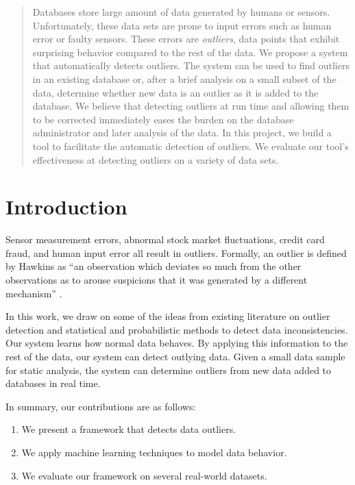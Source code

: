 \documentclass{vldb}
\begin{document}
\maketitle

\begin{abstract}
Databases store large amount of data generated by humans or sensors.
Unfortunately, these data sets are prone to input errors such as human error or faulty sensors.
These errors are \emph{outliers}, data points that exhibit surprising behavior compared to the rest of the data.
We propose a system that automatically detects outliers.
The system can be used to find outliers in an existing database or, after a brief analysis on a small subset of the data, determine whether new data is an outlier as it is added to the database.
We believe that detecting outliers at run time and allowing them to be corrected immediately eases the burden on the database administrator and later analysis of the data.
In this project, we build a tool to facilitate the automatic detection of outliers.
We evaluate our tool's effectiveness at detecting outliers on a variety of data sets.
\end{abstract}

\section{Introduction}
Sensor measurement errors, abnormal stock market fluctuations, credit card fraud, and human input error all result in outliers.
Formally, an outlier is defined by Hawkins as “an observation which deviates so much from the other observations as to arouse suspicions that it was generated by a different mechanism” \cite{Hawkins1980}.


In this work, we draw on some of the ideas from existing literature on outlier detection and statistical and probabilistic methods to detect data inconsistencies.
Our system learns how normal data behaves.
By applying this information to the rest of the data, our system can detect outlying data.
Given a small data sample for static analysis, the system can determine outliers from new data added to databases in real time.

In summary, our contributions are as follows:
\begin{enumerate}
\item We present a framework that detects data outliers.
\item We apply machine learning techniques to model data behavior.
\item We evaluate our framework on several real-world datasets.
\end{enumerate}
\end{document}

